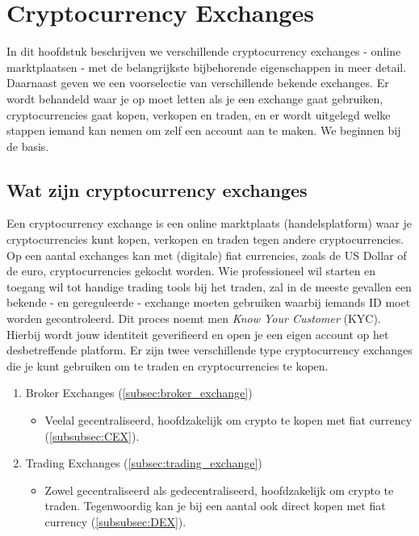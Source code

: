 \chapter{Cryptocurrency Exchanges}
\label{ch:exchanges}

In dit hoofdstuk beschrijven we verschillende cryptocurrency exchanges - online marktplaatsen - met de belangrijkste bijbehorende eigenschappen in meer detail. Daarnaast geven we een voorselectie van verschillende bekende exchanges. Er wordt behandeld waar je op moet letten als je een exchange gaat gebruiken, cryptocurrencies gaat kopen, verkopen en traden, en er wordt uitgelegd welke stappen iemand kan nemen om zelf een account aan te maken. We beginnen bij de basis.

\medskip

\section{Wat zijn cryptocurrency exchanges}
Een cryptocurrency exchange is een online marktplaats (handelsplatform) waar je cryptocurrencies kunt kopen, verkopen en traden tegen andere cryptocurrencies. Op een aantal exchanges kan met (digitale) fiat currencies, zoals de US Dollar of de euro, cryptocurrencies gekocht worden. Wie professioneel wil starten en toegang wil tot handige trading tools bij het traden, zal in de meeste gevallen een bekende - en gereguleerde - exchange moeten gebruiken waarbij iemands ID moet worden gecontroleerd. Dit proces noemt men \emph{Know Your Customer} (KYC). Hierbij wordt jouw identiteit geverifieerd en open je een eigen account op het desbetreffende platform. Er zijn twee verschillende type cryptocurrency exchanges die je kunt gebruiken om te traden en cryptocurrencies te kopen.\medskip

\begin{enumerate}[label=(\alph*)]
  \setlength\itemsep{0em}
    \item Broker Exchanges (\cref{subsec:broker_exchange})
        \begin{itemize}
            \item Veelal gecentraliseerd, hoofdzakelijk om crypto te kopen met fiat currency (\cref{subsubsec:CEX}).
        \end{itemize}
    \item Trading Exchanges (\cref{subsec:trading_exchange})
        \begin{itemize}
            \item Zowel gecentraliseerd als gedecentraliseerd, hoofdzakelijk om crypto te traden. Tegenwoordig kan je bij een aantal ook direct kopen met fiat currency (\cref{subsubsec:DEX}).       
            \end{itemize}
\end{enumerate}

